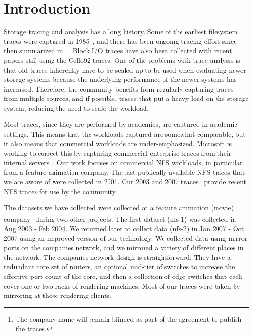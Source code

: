 \section{Introduction}



Storage tracing and analysis has a long history.  Some of the earliest
filesystem traces were captured in 1985~\cite{ousterhout85}, and there
has been ongoing tracing effort since then summarized in
~\cite{LeungUsenix08}.  Block I/O traces have also been collected with
recent papers still using the Cello92 traces.  One of the problems
with trace analysis is that old traces inherently have to be scaled up
to be used when evaluating newer storage systems because the
underlying performance of the newer systems has increased.  Therefore,
the community benefits from regularly capturing traces from multiple
sources, and if possible, traces that put a heavy load on the storage
system, reducing the need to scale the workload.

Most traces, since they are performed by academics, are captured in
academic settings.  This means that the workloads captured are
somewhat comparable, but it also means that commercial workloads are
under-emphasized.  Microsoft is working to correct this by capturing
commercial enterprise traces from their internal
servers~\cite{snia-iotta-microsoft}.  Our work focuses on commercial
NFS workloads, in particular from a feature animation company.  The
last publically available NFS traces that we are aware of were
collected in 2001.  Our 2003 and 2007
traces~\cite{animation-bear-traces} provide recent NFS traces for use
by the community.

The datasets we have collected were collected at a feature animation
(movie) company\footnote{The company name will remain blinded as part
of the agreement to publish the traces.} during two other projects.
The first dataset (nfs-1) was collected in Aug 2003 - Feb 2004.  We
returned later to collect data (nfs-2) in Jan 2007 - Oct 2007 using an
improved version of our technology.  We collected data using mirror
ports on the companies network, and we mirrored a variety of different
places in the network.  The companies network design is
straightforward: They have a redundant core set of routers, an
optional mid-tier of switches to increase the effective port count of
the core, and then a collection of edge switches that each cover one
or two racks of rendering machines.  Most of our traces were taken by
mirroring at those rendering clients.

